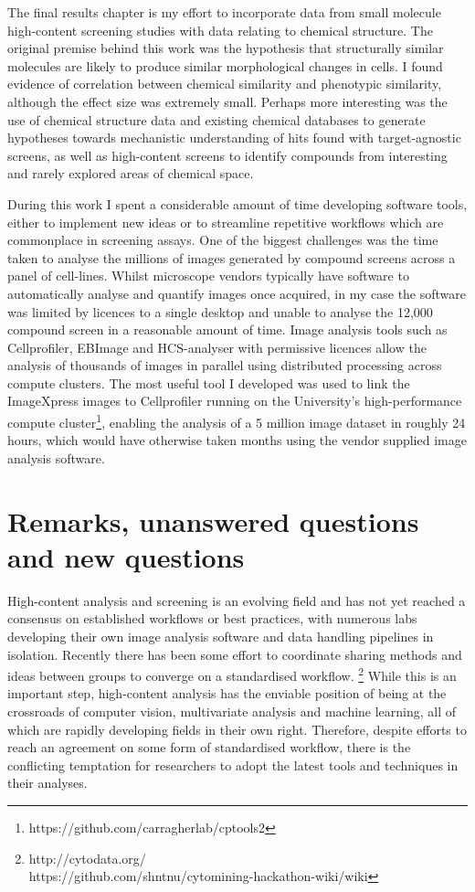 \documentclass[a4paper,11pt,twoside,openright]{scrbook}
\begin{document}
The final results chapter is my effort to incorporate data from small molecule high-content screening studies with data 
relating to chemical structure.
The original premise behind this work was the hypothesis that structurally similar molecules are likely to produce 
similar morphological changes in cells.
I found evidence of correlation between chemical similarity and phenotypic similarity, although the effect size was 
extremely small.
Perhaps more interesting was the use of chemical structure data and existing chemical databases to generate hypotheses 
towards mechanistic understanding of hits found with target-agnostic screens, as well as high-content screens to 
identify compounds from interesting and rarely explored areas of chemical space.

During this work I spent a considerable amount of time developing software tools, either to implement new ideas or to 
streamline repetitive workflows which are commonplace in screening assays.
One of the biggest challenges was the time taken to analyse the millions of images generated by compound screens across 
a panel of cell-lines.
Whilst microscope vendors typically have software to automatically analyse and quantify images once acquired, in my 
case the software was limited by licences to a single desktop and unable to analyse the 12,000 compound screen in a 
reasonable amount of time.
Image analysis tools such as Cellprofiler, EBImage and HCS-analyser with permissive licences allow the analysis of 
thousands of images in parallel using distributed processing across compute clusters.
The most useful tool I developed was used to link the ImageXpress images to Cellprofiler running on the University's 
high-performance compute cluster\footnote{https://github.com/carragherlab/cptools2}, enabling the analysis of a 5 
million image dataset in roughly 24 hours, which would have otherwise taken months using the vendor supplied image 
analysis software.


\section{Remarks, unanswered questions and new questions}

High-content analysis and screening is an evolving field and has not yet reached a consensus on established workflows 
or best practices, with numerous labs developing their own image analysis software and data handling pipelines in 
isolation.
Recently there has been some effort to coordinate sharing methods and ideas between groups to converge on a 
standardised workflow. \footnote{http://cytodata.org/ \\
https://github.com/shntnu/cytomining-hackathon-wiki/wiki}
While this is an important step, high-content analysis has the enviable position of being at the crossroads of computer 
vision, multivariate analysis and machine learning, all of which are rapidly developing fields in their own right.
Therefore, despite efforts to reach an agreement on some form of standardised workflow, there is the conflicting 
temptation for researchers to adopt the latest tools and techniques in their analyses.
\end{document}
